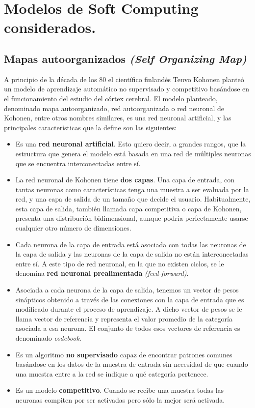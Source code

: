 ﻿\chapter{Modelos de Soft Computing considerados.}
\section{Mapas autoorganizados \textit{(Self Organizing Map)}}
A principio de la década de los 80 el científico finlandés Teuvo Kohonen \cite{kohonensom} planteó un modelo de aprendizaje automático no supervisado y competitivo basándose en el funcionamiento del estudio del córtex cerebral. El modelo planteado, denominado mapa autoorganizado, red autoorganizada o red neuronal de Kohonen, entre otros nombres similares, es una red neuronal artificial, y las principales características que la define son las siguientes:

\begin{itemize}
	\item Es una \textbf{red neuronal artificial}. Esto quiero decir, a grandes rangos, que la estructura que genera el modelo está basada en una red de múltiples neuronas que se encuentra interconectadas entre sí.
	
	\item La red neuronal de Kohonen tiene \textbf{dos capas}. Una capa de entrada, con tantas neuronas como características tenga una muestra a ser evaluada por la red, y una capa de salida de un tamaño que decide el usuario. Habitualmente, esta capa de salida, también llamada capa competitiva o capa de Kohonen, presenta una distribución bidimensional, aunque podría perfectamente usarse cualquier otro número de dimensiones.

	\item Cada neurona de la capa de entrada está asociada con todas las neuronas de la capa de salida y las neuronas de la capa de salida no están interconectadas entre sí. A este tipo de red neuronal, en la que no existen ciclos, se le denomina \textbf{red neuronal prealimentada} \textit{(feed-forward)}.

	\item Asociada a cada neurona de la capa de salida, tenemos un vector de pesos sinápticos obtenido a través de las conexiones con la capa de entrada que es modificado durante el proceso de aprendizaje. A dicho vector de pesos se le llama vector de referencia y representa el valor promedio de la categoría asociada a esa neurona. El conjunto de todos esos vectores de referencia es denominado \textit{codebook}.

	\item Es un algoritmo \textbf{no supervisado} capaz de encontrar patrones comunes basándose en los datos de la muestra de entrada sin necesidad de que cuando una muestra entre a la red se indique a qué categoría pertenece.

	\item Es un modelo \textbf{competitivo}. Cuando se recibe una muestra todas las neuronas compiten por ser activadas pero sólo la mejor será activada.
\end{itemize}

